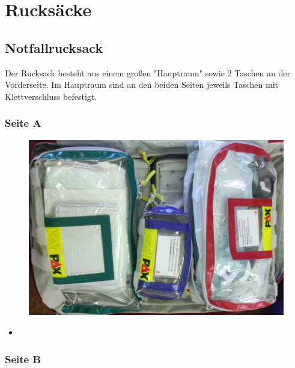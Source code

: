 \chapter{Rucksäcke}
\section{Notfallrucksack}
Der Rucksack besteht aus einem großen "Hauptraum" sowie 2 Taschen an der Vorderseite.
Im Hauptraum sind an den beiden Seiten jeweils Taschen mit Klettverschluss befestigt.
\subsection*{Seite A}
\begin{figure}[H]
    \centering
    \includegraphics[width=\textwidth]{res/rucksack_a.png}
\end{figure}
\begin{itemize}
    \item 
\end{itemize}
\subsection*{Seite B}